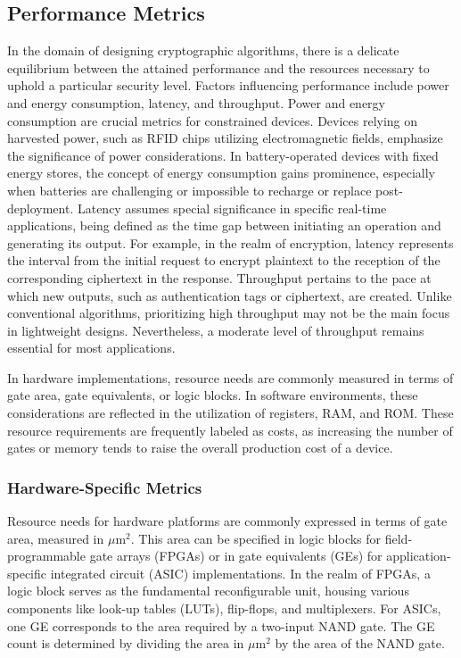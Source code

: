 \documentclass[conference,compsoc]{IEEEtran}
\begin{document}
\subsection{Performance Metrics} 
In the domain of designing cryptographic algorithms, there is a delicate equilibrium between the attained performance and the resources necessary to uphold a particular security level. Factors influencing performance include power and energy consumption, latency, and throughput.
Power and energy consumption are crucial metrics for constrained devices. Devices relying on harvested power, such as RFID chips utilizing electromagnetic fields, emphasize the significance of power considerations. In battery-operated devices with fixed energy stores, the concept of energy consumption gains prominence, especially when batteries are challenging or impossible to recharge or replace post-deployment.
Latency assumes special significance in specific real-time applications, being defined as the time gap between initiating an operation and generating its output. For example, in the realm of encryption, latency represents the interval from the initial request to encrypt plaintext to the reception of the corresponding ciphertext in the response.
Throughput pertains to the pace at which new outputs, such as authentication tags or ciphertext, are created. Unlike conventional algorithms, prioritizing high throughput may not be the main focus in lightweight designs. Nevertheless, a moderate level of throughput remains essential for most applications.

In hardware implementations, resource needs are commonly measured in terms of gate area, gate equivalents, or logic blocks. In software environments, these considerations are reflected in the utilization of registers, RAM, and ROM. These resource requirements are frequently labeled as costs, as increasing the number of gates or memory tends to raise the overall production cost of a device\cite{NIST}\cite{IoT_1}.
\subsubsection{Hardware-Specific Metrics} 
Resource needs for hardware platforms are commonly expressed in terms of gate area, measured in \(\mu \text{m}^2\). This area can be specified in logic blocks for field-programmable gate arrays (FPGAs) or in gate equivalents (GEs) for application-specific integrated circuit (ASIC) implementations.
In the realm of FPGAs, a logic block serves as the fundamental reconfigurable unit, housing various components like look-up tables (LUTs), flip-flops, and multiplexers.
For ASICs, one GE corresponds to the area required by a two-input NAND gate. The GE count is determined by dividing the area in \(\mu \text{m}^2\) by the area of the NAND gate.
\end{document}
